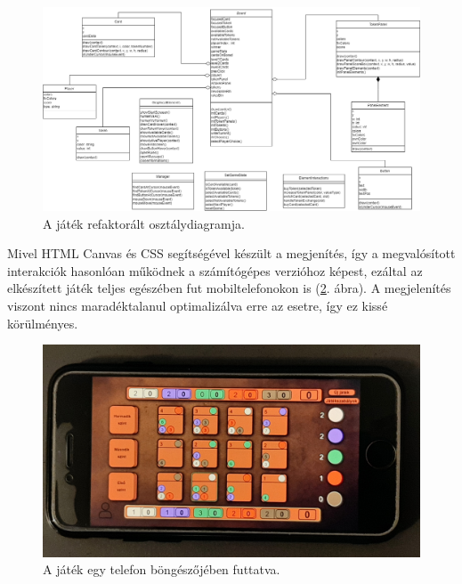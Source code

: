 \begin{figure}[h]
\centering
\includegraphics[scale=0.3]{images/refactored_UML.png}
\caption{A játék refaktorált osztálydiagramja.}
\label{fig:refactored_uml}
\end{figure}


Mivel HTML Canvas és CSS segítségével készült a megjenítés, így a megvalósított interakciók hasonlóan működnek a számítógépes verzióhoz képest, ezáltal az elkészített játék teljes egészében fut mobiltelefonokon is (\ref{fig:phone}. ábra). A megjelenítés viszont nincs maradéktalanul optimalizálva erre az esetre, így ez kissé körülményes.

\begin{figure}[h]
\centering
\includegraphics[scale=0.1]{images/phone.jpg}
\caption{A játék egy telefon böngészőjében futtatva.}
\label{fig:phone}
\end{figure}